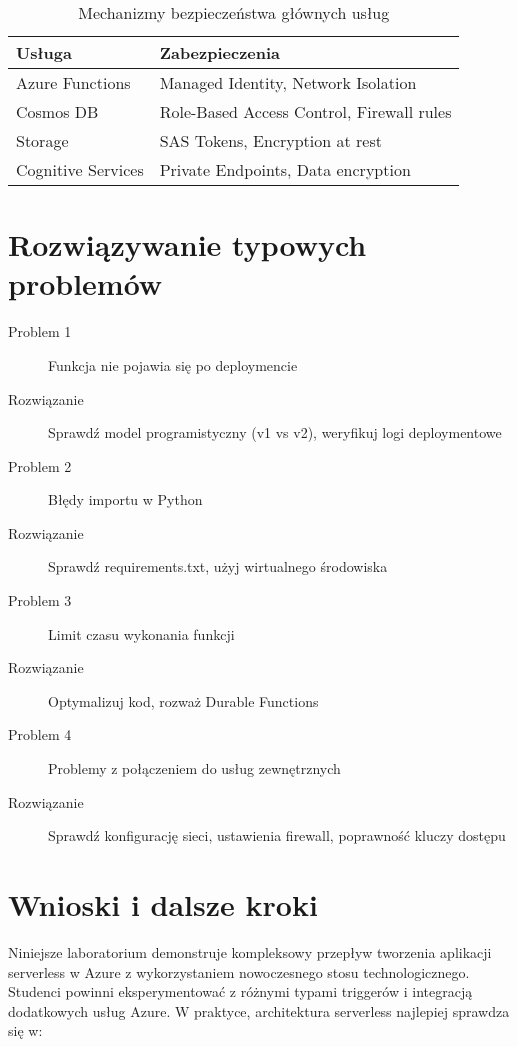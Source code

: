\documentclass{article}
\begin{document}
\begin{table}[ht]
\centering
\begin{tabularx}{\textwidth}{|l|X|}
\hline
\textbf{Usługa} & \textbf{Zabezpieczenia} \\
\hline
Azure Functions & Managed Identity, Network Isolation \\
Cosmos DB & Role-Based Access Control, Firewall rules \\
Storage & SAS Tokens, Encryption at rest \\
Cognitive Services & Private Endpoints, Data encryption \\
\hline
\end{tabularx}
\caption{Mechanizmy bezpieczeństwa głównych usług}
\end{table}

\section{Rozwiązywanie typowych problemów}
\begin{description}
\item[Problem 1] Funkcja nie pojawia się po deploymencie
\item[Rozwiązanie] Sprawdź model programistyczny (v1 vs v2), weryfikuj logi deploymentowe

\item[Problem 2] Błędy importu w Python
\item[Rozwiązanie] Sprawdź requirements.txt, użyj wirtualnego środowiska

\item[Problem 3] Limit czasu wykonania funkcji
\item[Rozwiązanie] Optymalizuj kod, rozważ Durable Functions

\item[Problem 4] Problemy z połączeniem do usług zewnętrznych
\item[Rozwiązanie] Sprawdź konfigurację sieci, ustawienia firewall, poprawność kluczy dostępu
\end{description}

\section{Wnioski i dalsze kroki}
Niniejsze laboratorium demonstruje kompleksowy przepływ tworzenia aplikacji serverless w Azure z wykorzystaniem nowoczesnego stosu technologicznego. Studenci powinni eksperymentować z różnymi typami triggerów i integracją dodatkowych usług Azure. W praktyce, architektura serverless najlepiej sprawdza się w:
\end{document}
